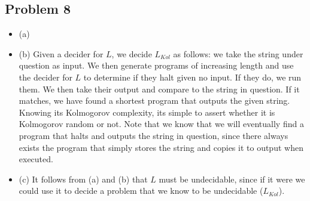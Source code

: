 \documentclass[english]{article}
\begin{document}
\subsection*{Problem 8}
\begin{itemize}
\item (a) 
\item (b) Given a decider for $L$, we decide $L_{Kol}$ as follows: we take the
  string under question as input. We then generate programs of increasing length
  and use the decider for $L$ to determine if they halt given no input. If they do,
  we run them. We then take their output and compare to the string in question. If
  it matches, we have found a shortest program that outputs the given string. Knowing
  its Kolmogorov complexity, its simple to assert whether it is Kolmogorov random or not.
  Note that we know that we will eventually find a program that halts and outputs the
  string in question, since there always exists the program that simply stores the
  string and copies it to output when executed.
\item (c) It follows from (a) and (b) that $L$ must be undecidable, since if
  it were we could use it to decide a problem that we know to be undecidable
  ($L_{Kol}$).
\end{itemize}
\end{document}

